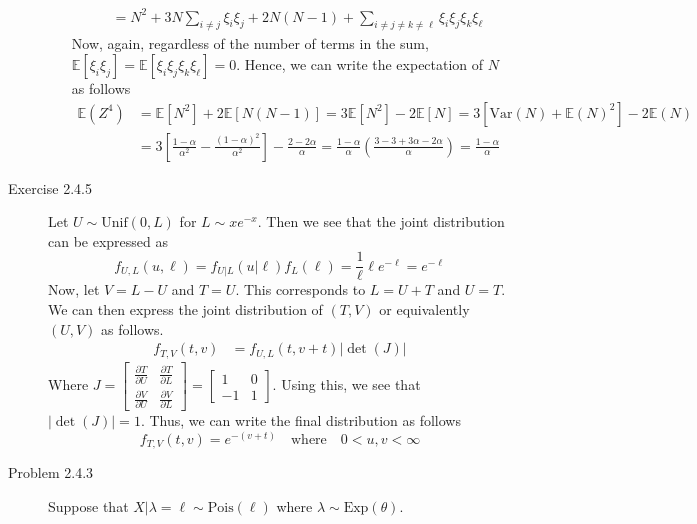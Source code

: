 \documentclass[12pt]{article}  %
\newcommand{\E}{{\mathbb{E}}}
\newcommand{\V}{{\text{Var}}}
\begin{document}
\begin{description}
\begin{enumerate}[a]
\begin{align*}
		&= N^2 + 3N\sum_{i\neq j}\xi_i\xi_j + 2N(N-1) + \sum_{i\neq j \neq k\neq \ell}\xi_i\xi_j\xi_k\xi_{\ell}
		\end{align*}
		Now, again, regardless of the number of terms in the sum, $\E[\xi_i\xi_j] = \E[\xi_i\xi_j\xi_k\xi_{\ell}] = 0$. Hence, we can write the expectation of $N$ as follows 
		\begin{align*}
		\E(Z^4) &= \E[N^2] + 2\E[N(N-1)] = 3\E[N^2] - 2\E[N] = 3[\V(N) + \E(N)^2]-2\E(N)\\
		&= 3\left[\frac{1-\alpha}{\alpha^2} - \frac{(1-\alpha)^2}{\alpha^2}\right] - \frac{2-2\alpha}{\alpha} = \frac{1-\alpha}{\alpha}\left(\frac{3 - 3+3\alpha-2\alpha}{\alpha}\right) = \frac{1-\alpha}{\alpha}
		\end{align*}


	\end{enumerate}


\item[Exercise 2.4.5] Let $U \sim\text{Unif}(0,L)$ for $L\sim xe^{-x}$. Then we see that the joint distribution can be expressed as $$f_{U,L}(u,\ell) = f_{U|L}(u|\ell)f_{L}(\ell) = \frac{1}{\ell}\ell e^{-\ell} = e^{-\ell}$$ 
Now, let $V = L-U$ and $T = U$. This corresponds to $L = U + T$ and $U = T$. We can then express the joint distribution of $(T,V)$ or equivalently $(U, V)$ as follows.
\begin{align*}
f_{T,V}(t,v) &= f_{U,L}(t, v+t)|\det(J)|
\end{align*}
Where $J = \begin{bmatrix}\frac{\partial T}{\partial U} & \frac{\partial T}{\partial L}\\ \frac{\partial V}{\partial U} & \frac{\partial V}{\partial L}\end{bmatrix} = \begin{bmatrix}1 & 0\\ -1 & 1\end{bmatrix}$. Using this, we see that $|\det(J)| = 1$. Thus, we can write the final distribution as follows $$f_{T,V}(t,v) = e^{-(v+t)}\hspace{1em}\text{where}\hspace{1em} 0<u,v<\infty$$ 

\item[Problem 2.4.3] Suppose that $X|\lambda = \ell\sim\text{Pois}(\ell)$ where $\lambda \sim\text{Exp}(\theta)$. 


\end{description}
\end{document}
